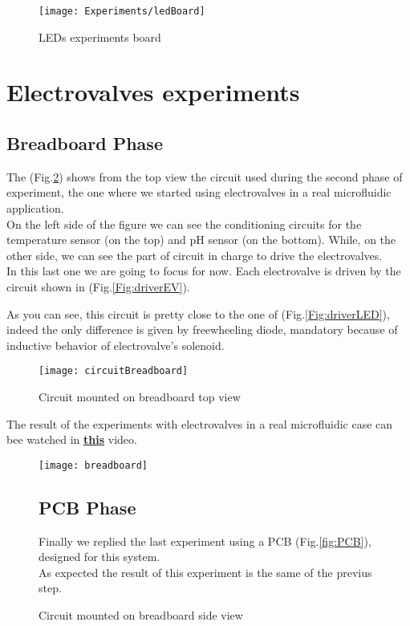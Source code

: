 	
	\begin{figure}[h]
		\centering
		\texttt{[image: Experiments/ledBoard]}
		\caption{LEDs experiments board}
		\label{Fig:circuitLED}
	\end{figure}
	
	
	\section{Electrovalves experiments}
	
	\subsection{Breadboard Phase}
	The (Fig.\ref{Fig:circuitBreadboard}) shows from the top view the circuit used during the second phase of experiment, the one where we started using electrovalves in a real microfluidic application.\\
	On the left side of the figure we can see the conditioning circuits for the temperature sensor (on the top) and pH sensor (on the bottom). While, on the other side, we can see the part of circuit in charge to drive the electrovalves.\\
	In this last one we are going to focus for now. Each electrovalve is driven by the circuit shown in (Fig.\ref{Fig:driverEV}).
	\clearpage
	
	
	
	As you can see, this circuit is pretty close to the one of (Fig.\ref{Fig:driverLED}), indeed the only difference is given by freewheeling diode, mandatory because of inductive behavior of electrovalve's solenoid.
	
	\begin{figure}[h]
		\centering
		\texttt{[image: circuitBreadboard]}
		\caption{Circuit mounted on breadboard top view}
		\label{Fig:circuitBreadboard}
	\end{figure}
	
	
	The result of the experiments with electrovalves in a real microfluidic case can bee watched in  \href{https://www.youtube.com/watch?v=CavCVnD2P1k}{\textbf{this}} video.
	
	\begin{figure}[h]
		\begin{center}
		\texttt{[image: breadboard]}
		\caption{Circuit mounted on breadboard side view}
		\label{Fig:circuitsfumatp}
	\end{center}
	\subsection{PCB Phase}
	
	Finally we replied the last experiment using a PCB (Fig.\ref{fig:PCB}),  designed for this system.\\
	As expected the result of this experiment is the same of the previus step. 
	\end{figure}